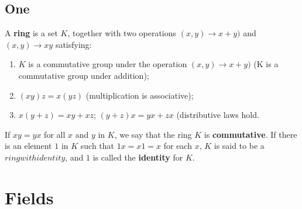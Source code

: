 \documentclass[main.tex]{subfiles}
\begin{document}
\section{One}
\begin{definition}
A \textbf{ring} is a set $K$, together with two operations $(x, y) \rightarrow x + y)$ and $(x, y) \rightarrow xy$ satisfying: 
\begin{enumerate}[label=\Alph*]
    \item $K$ is a commutative group under the operation $(x, y) \rightarrow x + y)$ (K is a commutative group under addition);
    \item $(xy)z = x(yz)$ (multiplication is associative);
    \item $x(y + z)  = xy + xz$; $(y + z)x = yx + zx$ (distributive laws hold.
\end{enumerate}
If $xy = yx$ for all $x$ and $y$ in $K$, we say that the ring $K$ is \textbf{commutative}. If there is an element $1$ in $K$ such that $1x = x1 = x$ for each $x$, $K$ is said to be a $ring with identity$, and $1$ is called the \textbf{identity} for $K$.  
\end{definition}

\chapter{Fields}
\end{document}
